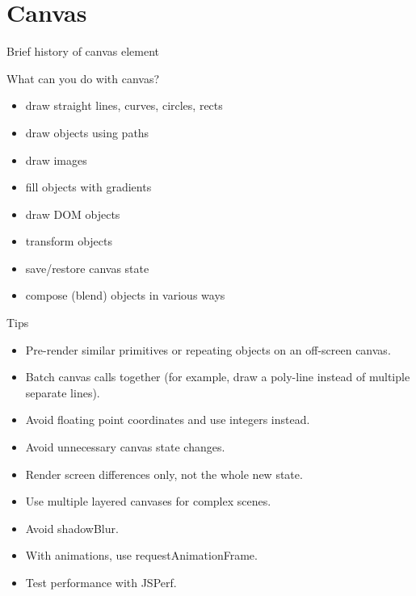 \documentclass{beamer}
\begin{document}
\section{Canvas}

\begin{frame}{Brief history of canvas element}
\end{frame}

\begin{frame}{What can you do with canvas?}
\begin{itemize}
    \item draw straight lines, curves, circles, rects
    \item draw objects using paths
    \item draw images
    \item fill objects with gradients
    \item draw DOM objects
    \item transform objects
    \item save/restore canvas state
    \item compose (blend) objects in various ways
\end{itemize}
\end{frame}

\begin{frame}{Tips}
\begin{itemize}
    \item Pre-render similar primitives or repeating objects on an off-screen canvas.
    \item Batch canvas calls together (for example, draw a poly-line instead of multiple separate lines).
    \item Avoid floating point coordinates and use integers instead.
    \item Avoid unnecessary canvas state changes.
    \item Render screen differences only, not the whole new state.
    \item Use multiple layered canvases for complex scenes.
    \item Avoid shadowBlur.
    \item With animations, use requestAnimationFrame.
    \item Test performance with JSPerf.

\end{itemize}
\end{frame}
\end{document}
